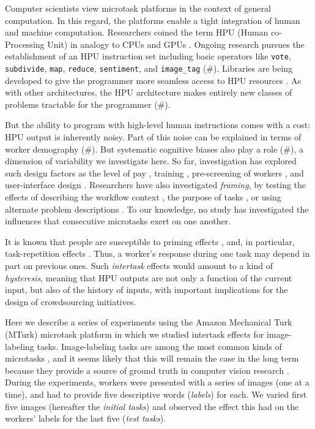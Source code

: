 \documentclass[12pt]{article}
\begin{document}
Computer scientists view microtask platforms in the context of general
computation.  In this regard, the platforms enable a tight integration of 
human and machine computation.  Researchers coined the term HPU 
(Human co-Processing Unit) in analogy to CPUs and GPUs \cite{5543192}.  
Ongoing research pursues the establishment of an HPU instruction set
including basic operators like \texttt{vote}, \texttt{subdivide}, \texttt{map},
\texttt{reduce}, \texttt{sentiment}, and \texttt{image\_tag} (\#).  Libraries 
are being developed to give the programmer more seamless access to HPU 
resources 
 \cite{little2010turkit,minder2011crowdlang,minder2012crowdlang,kittur2011crowdforge}.  
As with other architectures, the HPU architecture makes entirely new classes 
of problems tractable for the programmer (\#).

But the ability to program with high-level human instructions comes with a 
cost: HPU output is inherently noisy.  Part of this noise can be explained
in terms of worker demography (\#).  But systematic cognitive biases also 
play a role (\#), a dimension of variability we investigate here.   
So far, investigation has explored such design factors as the level of 
pay \cite{kazai2013analysis}, training \cite{le2010ensuring}, pre-screening of 
workers \cite{paolacci2010running}, and user-interface design 
\cite{Finnerty2013}.  Researchers have also investigated \textit{framing}, 
by testing the effects of describing the workflow context 
\cite{Kinnaird2012281}, the purpose of tasks 
\cite{chandler2013breaking}, or using alternate problem descriptions
\cite{thibodeau2013natural}.  To our knowledge, no study has investigated 
the influences that consecutive microtasks exert on one another.

It is known that people are susceptible to priming effects 
\cite{BJOP1796,No2007,beller1971priming}, and, in particular, task-repetition 
effects \cite{Gass1999549,sohn2001task}.  Thus, a worker's response during
one task may depend in part on previous ones.  Such \textit{intertask} effects
would amount to a kind of \textit{hysteresis}, meaning that HPU outputs are not
only a function of the current input, but also of the history of inputs, with
important implications for the design of crowdsourcing initiatives.

Here we describe a series of experiments using the Amazon Mechanical
Turk (MTurk) microtask platform in which we studied intertask effects
for image-labeling tasks.  Image-labeling tasks are among the most 
common kinds of microtasks
\cite{chandler2013breaking,Berinsky2012351,Finnerty2013,paolacci2010running}, 
and it seems likely that this will remain the case in the long term because
they provide a source of ground truth in computer vision research 
\cite{5543192}.  
During the experiments, workers were presented with a series of images (one at
a time), and had to provide five descriptive words (\textit{labels}) for each.
We varied first five images (hereafter the \textit{initial tasks})
and observed the effect this had on the workers' labels for the last five
(\textit{test tasks}).
\end{document}
